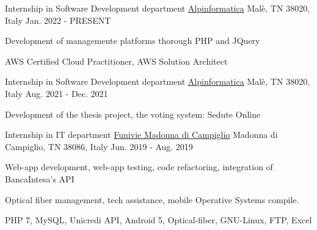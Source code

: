 

\begin{cventries}
  \cventry
    {Internship in Software Development department} %
    {\href{https://www.alpinformatica.com/}{Alpinformatica}} %
    {Malè, TN 38020, Italy} %
    {Jan. 2022 - PRESENT} %
    {
      \begin{cvitems} %
        \item {Development of managemente platforms thorough PHP and JQuery}
        \item {AWS Certified Cloud Practitioner, AWS Solution Architect}
      \end{cvitems}
      }
  \cventry
    {Internship in Software Development department} %
    {\href{https://www.alpinformatica.com/}{Alpinformatica}} %
    {Malè, TN 38020, Italy} %
    {Aug. 2021 - Dec. 2021} %
    {
      \begin{cvitems} %
        \item {Development of the thesis project, the voting system: Sedute Online}
      \end{cvitems}
      }
  \cventry
    {Internship in IT department} %
    {\href{https://www.funiviecampiglio.it}{Funivie Madonna di Campiglio}} %
    {Madonna di Campiglio, TN 38086, Italy} %
    {Jun. 2019 - Aug. 2019} %
    {
      \begin{cvitems} %
        \item {Web-app development, web-app testing, code refactoring, integration of BancaIntesa's API}
        \item {Optical fiber management, tech assistance, mobile Operative Systems compile.}
        \item {PHP 7, MySQL, Unicredi API, Android 5, Optical-fiber, GNU-Linux, FTP, Excel}
      \end{cvitems}
      }
    


\end{cventries}
